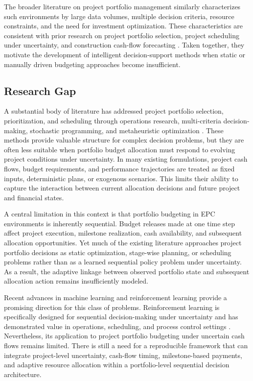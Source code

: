 The broader literature on project portfolio management similarly characterizes such environments by large data volumes, multiple decision criteria, resource constraints, and the need for investment optimization. These characteristics are consistent with prior research on project portfolio selection, project scheduling under uncertainty, and construction cash-flow forecasting \citep{gutjahr2013project,doerner2006pareto,khanzadi2018integrating,golenko1997stochastic,ballesteros2015resource,barraza2007probabilistic}. Taken together, they motivate the development of intelligent decision-support methods when static or manually driven budgeting approaches become insufficient.

\subsection{Research Gap}

A substantial body of literature has addressed project portfolio selection, prioritization, and scheduling through operations research, multi-criteria decision-making, stochastic programming, and metaheuristic optimization \citep{archer1999integrated,liesio2007portfolio,klerides2019stochastic,elshaer2014genetic}. These methods provide valuable structure for complex decision problems, but they are often less suitable when portfolio budget allocation must respond to evolving project conditions under uncertainty. In many existing formulations, project cash flows, budget requirements, and performance trajectories are treated as fixed inputs, deterministic plans, or exogenous scenarios. This limits their ability to capture the interaction between current allocation decisions and future project and financial states.

A central limitation in this context is that portfolio budgeting in EPC environments is inherently sequential. Budget releases made at one time step affect project execution, milestone realization, cash availability, and subsequent allocation opportunities. Yet much of the existing literature approaches project portfolio decisions as static optimization, stage-wise planning, or scheduling problems rather than as a learned sequential policy problem under uncertainty. As a result, the adaptive linkage between observed portfolio state and subsequent allocation action remains insufficiently modeled.

Recent advances in machine learning and reinforcement learning provide a promising direction for this class of problems. Reinforcement learning is specifically designed for sequential decision-making under uncertainty and has demonstrated value in operations, scheduling, and process control settings \citep{puterman1994markov,sutton2018reinforcement,wauters2016learning,chen2018reinforcement,hubbs2020deep,bengio2021machine}. Nevertheless, its application to project portfolio budgeting under uncertain cash flows remains limited. There is still a need for a reproducible framework that can integrate project-level uncertainty, cash-flow timing, milestone-based payments, and adaptive resource allocation within a portfolio-level sequential decision architecture.

